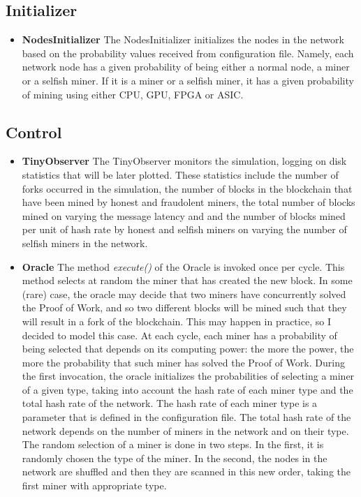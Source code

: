 \documentclass{article}
\begin{document}
\subsection{Initializer}
\begin{itemize}
\item \textbf{NodesInitializer} The NodesInitializer initializes the nodes in the network based on the probability values received from configuration file. Namely, each network node has a given probability of being either a normal node, a miner or a selfish miner. If it is a miner or a selfish miner, it has a given probability of mining using either CPU, GPU, FPGA or ASIC. 
\end{itemize}
\subsection{Control}
\begin{itemize}
\item \textbf{TinyObserver} The TinyObserver monitors the simulation, logging on disk statistics that will be later plotted. These statistics include the number of forks occurred in the simulation, the number of blocks in the blockchain that have been mined by honest and fraudolent miners, the total number of blocks mined on varying the message latency and and the number of blocks mined per unit of hash rate by honest and selfish miners on varying the number of selfish miners in the network. 
\item \textbf{Oracle} The method \textit{execute()} of the Oracle is invoked once per cycle. This method selects at random the miner that has created the new block. In some (rare) case, the oracle may decide that two miners have concurrently solved the Proof of Work, and so two different blocks will be mined such that they will result in a fork of the blockchain. This may happen in practice, so I decided to model this case. At each cycle, each miner has a probability of being selected that depends on its computing power: the more the power, the more the probability that such miner has solved the Proof of Work. During the first invocation, the oracle initializes the probabilities of selecting a miner of a given type, taking into account the hash rate of each miner type and the total hash rate of the network. The hash rate of each miner type is a parameter that is defined in the configuration file. The total hash rate of the network depends on the number of miners in the network and on their type. The random selection of a miner is done in two steps. In the first, it is randomly chosen the type of the miner. In the second, the nodes in the network are shuffled and then they are scanned in this new order, taking the first miner with appropriate type.
\end{itemize}
\end{document}
